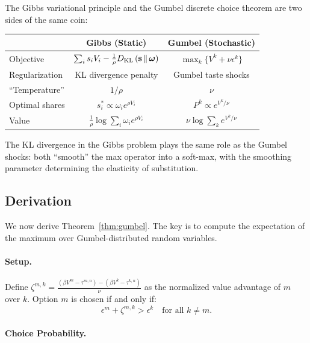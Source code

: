 \begin{calloutimportant}
The Gibbs variational principle and the Gumbel discrete choice theorem are two sides of the same coin:

\begin{center}
\begin{tabular}{lcc}
\toprule
& \textbf{Gibbs (Static)} & \textbf{Gumbel (Stochastic)} \\
\midrule
Objective & $\sum_i s_i V_i - \frac{1}{\rho} D_{\mathrm{KL}}\left(\mathbf{s} \,\|\, \boldsymbol{\omega}\right)$ & $\max_k \{ V^k + \nu \epsilon^k \}$ \\
Regularization & KL divergence penalty & Gumbel taste shocks \\
``Temperature'' & $1/\rho$ & $\nu$ \\
Optimal shares & $s_i^* \propto \omega_i e^{\rho V_i}$ & $P^k \propto e^{V^k/\nu}$ \\
Value & $\frac{1}{\rho} \log \sum_i \omega_i e^{\rho V_i}$ & $\nu \log \sum_k e^{V^k/\nu}$ \\
\bottomrule
\end{tabular}
\end{center}

The KL divergence in the Gibbs problem plays the same role as the Gumbel shocks: both ``smooth'' the max operator into a soft-max, with the smoothing parameter determining the elasticity of substitution.
\end{calloutimportant}

\subsection{Derivation}

We now derive Theorem~\ref{thm:gumbel}. The key is to compute the expectation of the maximum over Gumbel-distributed random variables.

\paragraph{Setup.}

Define $\zeta^{m,k} = \frac{(\beta V^m - \tau^{m,n}) - (\beta V^k - \tau^{k,n})}{\nu}$ as the normalized value advantage of $m$ over $k$. Option $m$ is chosen if and only if:
\begin{equation}
\epsilon^m + \zeta^{m,k} > \epsilon^k \quad \text{for all } k \neq m.
\end{equation}

\paragraph{Choice Probability.}

